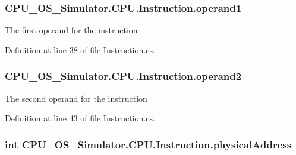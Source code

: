 \subsubsection[{operand1}]{ C\+P\+U\+\_\+\+O\+S\+\_\+\+Simulator.\+C\+P\+U.\+Instruction.\+operand1\hspace{0.3cm}{\ttfamily [private]}}\label{class_c_p_u___o_s___simulator_1_1_c_p_u_1_1_instruction_ab829270aeebc597814ded59f5265b452}


The first operand for the instruction 



Definition at line 38 of file Instruction.\+cs.

\hypertarget{class_c_p_u___o_s___simulator_1_1_c_p_u_1_1_instruction_a76e9ca211aca72f65c8ad9e11fbdad47}{}
\subsubsection[{operand2}]{ C\+P\+U\+\_\+\+O\+S\+\_\+\+Simulator.\+C\+P\+U.\+Instruction.\+operand2\hspace{0.3cm}{\ttfamily [private]}}\label{class_c_p_u___o_s___simulator_1_1_c_p_u_1_1_instruction_a76e9ca211aca72f65c8ad9e11fbdad47}


The second operand for the instruction 



Definition at line 43 of file Instruction.\+cs.

\hypertarget{class_c_p_u___o_s___simulator_1_1_c_p_u_1_1_instruction_a401c8f3740b63632e17db6f80b505a17}{}
\subsubsection[{physical\+Address}]{\setlength{\rightskip}{0pt plus 5cm}int C\+P\+U\+\_\+\+O\+S\+\_\+\+Simulator.\+C\+P\+U.\+Instruction.\+physical\+Address\hspace{0.3cm}{\ttfamily [private]}}\label{class_c_p_u___o_s___simulator_1_1_c_p_u_1_1_instruction_a401c8f3740b63632e17db6f80b505a17}


